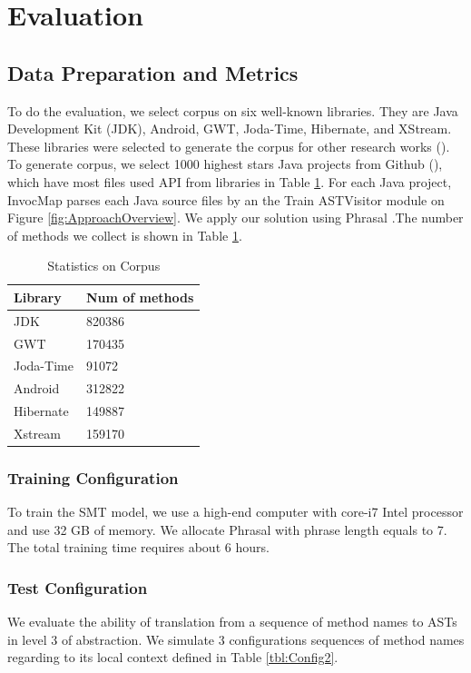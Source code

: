 \section{Evaluation}
\subsection{Data Preparation and Metrics}
To do the evaluation, we select corpus on six well-known libraries. They are Java Development Kit (JDK), Android, GWT, Joda-Time, Hibernate, and XStream. These libraries were selected to generate the corpus for other research works (\cite{8453132,Subramanian:2014:LAD:2568225.2568313}). To generate corpus, we select 1000 highest stars Java projects from Github (\cite{id:Github}), which have most files used API from libraries in Table \ref{tbl:DataPreparation}. For each Java project, InvocMap parses each Java source files by an the Train ASTVisitor module on Figure \ref{fig:ApproachOverview}. We apply our solution using Phrasal \cite{Green2014}.The number of methods we collect is shown in Table \ref{tbl:DataPreparation}. 
\begin{table}[]
\tiny
\centering
\caption{Statistics on Corpus}
\begin{tabular}{|l|l|}
\hline
\textbf{Library }  & \textbf{Num of methods} \\ \hline
JDK       & 820386         \\ \hline
GWT       & 170435         \\ \hline
Joda-Time & 91072          \\ \hline
Android   & 312822         \\ \hline
Hibernate & 149887         \\ \hline
Xstream   & 159170         \\ \hline
\end{tabular}

\label{tbl:DataPreparation}
\end{table}

\subsubsection{Training Configuration} To train the SMT model, we use a high-end computer with core-i7 Intel processor and use 32 GB of memory. We allocate Phrasal with phrase length equals to 7. The total training time requires about 6 hours.

\subsubsection{Test Configuration}
We evaluate the ability of translation from a sequence of method names to ASTs in level 3 of abstraction. We simulate 3 configurations sequences of method names regarding to its local context defined in Table \ref{tbl:Config2}. 

